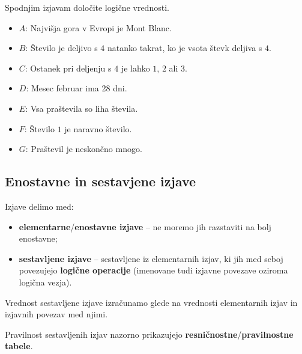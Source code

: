          

         
             \begin{naloga}
                Spodnjim izjavam določite logične vrednosti.
                \begin{itemize}   
                    \item $A$: Najvišja gora v Evropi je Mont Blanc.
                    \item $B$: Število je deljivo s $4$ natanko takrat, ko je vsota števk deljiva s $4$.
                    \item $C$: Ostanek pri deljenju s $4$ je lahko $1$, $2$ ali $3$.
                    \item $D$: Mesec februar ima 28 dni.
                    \item $E$: Vsa praštevila so liha števila.
                    \item $F$: Število $1$ je naravno število.
                    \item $G$: Praštevil je neskončno mnogo.
                \end{itemize}
            \end{naloga}
            
         

         
              \subsection{Enostavne in sestavjene izjave}
                
                Izjave delimo med:
                \begin{itemize}
                    \item \textbf{elementarne}/\textbf{enostavne izjave} -- ne moremo 
                        jih razstaviti na bolj enostavne;
                    \item \textbf{sestavljene izjave} -- sestavljene iz elementarnih izjav, 
                        ki jih med seboj povezujejo \textbf{logične operacije} (imenovane 
                        tudi izjavne povezave oziroma~ logična vezja).
                \end{itemize}
             

               
                Vrednost sestavljene izjave izračunamo glede na vrednosti elementarnih 
                izjav in izjavnih povezav med njimi.
             
               
                Pravilnost sestavljenih izjav nazorno prikazujejo 
                \textbf{resničnostne}/\textbf{pravilnostne tabele}.
             

